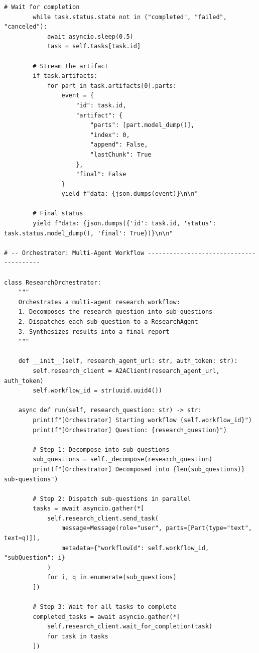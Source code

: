\begin{lstlisting}[style=pythonstyle]
        # Wait for completion
        while task.status.state not in ("completed", "failed", "canceled"):
            await asyncio.sleep(0.5)
            task = self.tasks[task.id]

        # Stream the artifact
        if task.artifacts:
            for part in task.artifacts[0].parts:
                event = {
                    "id": task.id,
                    "artifact": {
                        "parts": [part.model_dump()],
                        "index": 0,
                        "append": False,
                        "lastChunk": True
                    },
                    "final": False
                }
                yield f"data: {json.dumps(event)}\n\n"

        # Final status
        yield f"data: {json.dumps({'id': task.id, 'status': task.status.model_dump(), 'final': True})}\n\n"

# -- Orchestrator: Multi-Agent Workflow ----------------------------------------

class ResearchOrchestrator:
    """
    Orchestrates a multi-agent research workflow:
    1. Decomposes the research question into sub-questions
    2. Dispatches each sub-question to a ResearchAgent
    3. Synthesizes results into a final report
    """

    def __init__(self, research_agent_url: str, auth_token: str):
        self.research_client = A2AClient(research_agent_url, auth_token)
        self.workflow_id = str(uuid.uuid4())

    async def run(self, research_question: str) -> str:
        print(f"[Orchestrator] Starting workflow {self.workflow_id}")
        print(f"[Orchestrator] Question: {research_question}")

        # Step 1: Decompose into sub-questions
        sub_questions = self._decompose(research_question)
        print(f"[Orchestrator] Decomposed into {len(sub_questions)} sub-questions")

        # Step 2: Dispatch sub-questions in parallel
        tasks = await asyncio.gather(*[
            self.research_client.send_task(
                message=Message(role="user", parts=[Part(type="text", text=q)]),
                metadata={"workflowId": self.workflow_id, "subQuestion": i}
            )
            for i, q in enumerate(sub_questions)
        ])

        # Step 3: Wait for all tasks to complete
        completed_tasks = await asyncio.gather(*[
            self.research_client.wait_for_completion(task)
            for task in tasks
        ])


\end{lstlisting}
